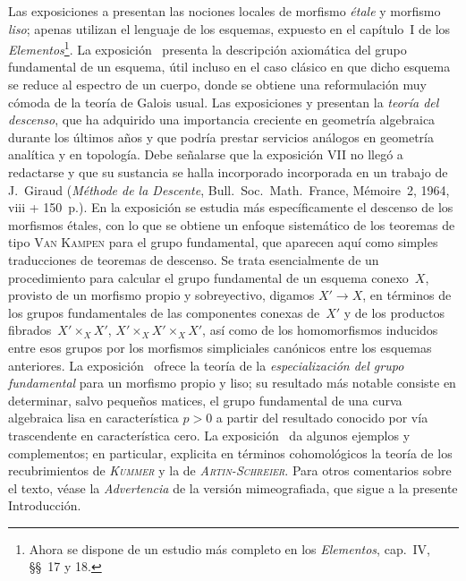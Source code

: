 Las exposiciones  a  presentan las nociones locales de morfismo \emph{étale} y morfismo \emph{liso}; apenas utilizan el lenguaje de los esquemas, expuesto en el capítulo~I de los \emph{Elementos}\footnote{Ahora se dispone de un estudio más completo en los \emph{Elementos}, cap.~IV, \S\S~17 y 18.}. La exposición~ presenta la descripción axiomática del grupo fundamental de un esquema, útil incluso en el caso clásico en que dicho esquema se reduce al espectro de un cuerpo, donde se obtiene una reformulación muy cómoda de la teoría de Galois usual. Las exposiciones  y  presentan la \emph{teoría del descenso}, que ha adquirido una importancia creciente en geometría algebraica durante los últimos años y que podría prestar servicios análogos en geometría analítica y en topología. Debe señalarse que la exposición VII no llegó a redactarse y que su sustancia se halla
{incorporado}
{incorporada}
en un trabajo de J.\ Giraud (\emph{Méthode de la Descente}, Bull.\ Soc.\ Math.\ France, Mémoire~2, 1964, viii + 150~p.). En la exposición  se estudia más específicamente el descenso de los morfismos étales, con lo que se obtiene un enfoque sistemático de los teoremas de tipo \textsc{Van Kampen} para el grupo fundamental, que aparecen aquí como simples traducciones de teoremas de descenso. Se trata esencialmente de un procedimiento para calcular el grupo fundamental de un esquema conexo~$X$, provisto de un morfismo propio y sobreyectivo, digamos $X'\to X$, en términos de los grupos fundamentales de las componentes conexas de~$X'$ y de los productos fibrados~$X'\times_X X'$, $X'\times_X X'\times_X X'$, así como de los homomorfismos inducidos entre esos grupos por los morfismos simpliciales canónicos entre los esquemas anteriores. La exposición~ ofrece la teoría de la \emph{especialización del grupo fundamental} para un morfismo propio y liso; su resultado más notable consiste en determinar, salvo pequeños matices, el grupo fundamental de una curva algebraica lisa en característica $p>0$ a partir del resultado conocido por vía trascendente en característica cero. La exposición~ da algunos ejemplos y complementos; en particular, explicita en términos cohomológicos la teoría de los recubrimientos de \emph{\textsc{Kummer}} y la de \emph{\textsc{Artin}-\textsc{Schreier}}. Para otros comentarios sobre el texto, véase la \emph{Advertencia} de la versión mimeografiada, que sigue a la presente Introducción.

